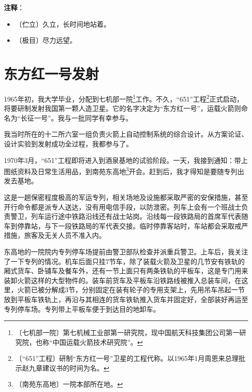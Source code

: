 \documentclass[12pt,UTF-8,openany]{ctexbook}
\begin{document}
\newpage

\textbf{注释}：

\vspace{-1em}

\begin{itemize}
    \setlength\itemsep{-0.2em}
    \item 〔伫立〕久立，长时间地站着。
    \item 〔极目〕尽力远望。
\end{itemize}

\chapter{东方红一号发射}

\begin{large}
    
    1965年初，我大学毕业，分配到七机部一院\footnote{〔七机部一院〕第七机械工业部第一研究院，现中国航天科技集团公司第一研究院，也称“中国运载火箭技术研究院”。}工作。不久，“651”工程\footnote{〔“651”工程〕研制“东方红一号”卫星的工程代称。以1965年1月周恩来总理批示赵九章建议书的时间为名。}正式启动，将要研制发射我国第一颗人造卫星。它的名字决定为“东方红一号”，运载火箭则命名为“长征一号”。我与一批同学有幸参与。
    
    我当时所在的十二所六室一组负责火箭上自动控制系统的综合设计。从方案论证、设计实验到发射成功全过程，我都参与了。
    
    1970年3月，“651”工程即将进入到酒泉基地的试验阶段。一天，我接到通知：带上图纸资料及日常生活用品，到南苑东高地\footnote{〔南苑东高地〕一院本部所在地。}开会。赶到后，我才得知是要随专列出发去基地。
    
    这是一趟保密程度极高的军运专列，相关场地及设施都采取严密的安保措施，甚至开行命令都是派专人送达，没有用电信手段，以防泄密。列车上会有一个班战士负责警卫，列车运行途中铁路沿线还有战士站岗。沿线每一段铁路局的首席军代表随车到停靠站，与下一段铁路局的军代表交接。临时停靠客站时，车站都会采取戒严措施，旅客及无关人员不准入内。
    
    东高地的一院院内专列停车场提前由警卫部队检查并派重兵警卫。上车后，我关注了一下专列的情况。机车后面只挂7节车，除了装载火箭及卫星的几节安有铁轨的厢式货车、卧铺车及餐车外，还有一节上面只有两条铁轨的平板车，这是专门用来装卸火箭这样的大型物件的。装车前货车及平板车沿铁路线被推入总装车间，在这里，火箭已被分解成3节，分别固定在装有轮子的专用支架上，先用吊车吊起一节放到平板车铁轨上，再沿与其相连的货车铁轨推入货车并固定好，全部装好再运至专列停车场。专列带上平板车便于到达目的地卸车。
    

\end{large}
\end{document}
